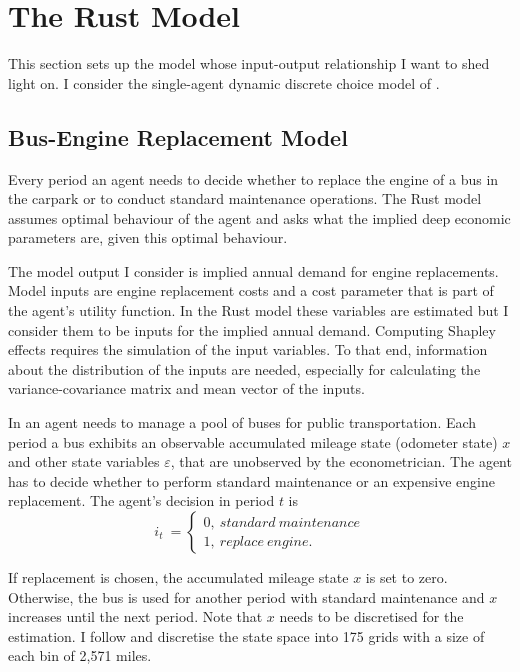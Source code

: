 \section{The Rust Model} \label{rust_model}

This section sets up the model whose input-output relationship I want to shed light on. I consider the single-agent dynamic discrete choice model of \citet{R87}.

\subsection{Bus-Engine Replacement Model}

Every period an agent needs to decide whether to replace the engine of a bus in the carpark or to conduct standard maintenance operations. The Rust model assumes optimal behaviour of the agent and asks what the implied deep economic parameters are, given this optimal behaviour.

The model output I consider is implied annual demand for engine replacements. Model inputs are engine replacement costs and a cost parameter that is part of the agent’s utility function. In the Rust model these variables are estimated but I consider them to be inputs for the implied annual demand. Computing Shapley effects requires the simulation of the input variables. To that end, information about the distribution of the inputs are needed, especially for calculating the variance-covariance matrix and mean vector of the inputs.

In \citet{R87} an agent needs to manage a pool of buses for public transportation. Each period a bus exhibits an observable accumulated mileage state (odometer state) $x$ and other state variables $\varepsilon$, that are unobserved by the econometrician. The agent has to decide whether to perform standard maintenance or an expensive engine replacement. The agent’s decision in period $t$ is
\begin{equation}
i_t\ =
\begin{cases}
0,\ standard\ maintenance \\
1,\ replace\ engine.
\end{cases}
\end{equation}

\noindent If replacement is chosen, the accumulated mileage state $x$ is set to zero. Otherwise, the bus is used for another period with standard maintenance and $x$ increases until the next period. Note that $x$ needs to be discretised for the estimation. I follow \citet{R87} and discretise the state space into 175 grids with a size of each bin of 2,571 miles.

